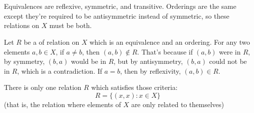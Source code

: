 \documentclass[12pt]{article}
\begin{document}
\section{}
\noindent{}\bigskip\par

\section{}
\noindent{}\bigskip\par
Equivalences are reflexive, symmetric, and transitive. Orderings are the same except they're required to be antisymmetric instead of symmetric, so these relations on $X$ must be both.
\par
Let $R$ be a of relation on $X$ which is an equivalence and an ordering. For any two elements $a,b \in X$, if $a \neq b$, then $(a,b) \not\in R$. That's because if $(a,b)$ were in $R$, by symmetry, $(b,a)$ would be in $R$, but by antisymmetry, $(b,a)$ could not be in $R$, which is a contradiction. If $a=b$, then by reflexivity, $(a,b) \in R$.
\par
There is only one relation $R$ which satisfies those criteria:
\[ R=\{(x,x): x\in X\} \]
(that is, the relation where elements of $X$ are only related to themselves)
\end{document}
